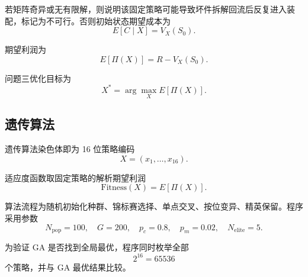若矩阵奇异或无有限解，则说明该固定策略可能导致坏件拆解回流后反复进入装配，标记为不可行。否则初始状态期望成本为
\[
E[C\mid X]=V_X(S_0).
\]

期望利润为
\[
E[\Pi(X)]
=
R-V_X(S_0).
\]

问题三优化目标为
\[
X^\ast=\arg\max_X E[\Pi(X)].
\]

\subsection{遗传算法}

遗传算法染色体即为 16 位策略编码
\[
X=(x_1,\ldots,x_{16}).
\]

适应度函数取固定策略的解析期望利润
\[
\mathrm{Fitness}(X)=E[\Pi(X)].
\]

算法流程为随机初始化种群、锦标赛选择、单点交叉、按位变异、精英保留。程序采用参数
\[
N_{\mathrm{pop}}=100,\quad
G=200,\quad
p_c=0.8,\quad
p_m=0.02,\quad
N_{\mathrm{elite}}=5.
\]

为验证 GA 是否找到全局最优，程序同时枚举全部
\[
2^{16}=65536
\]
个策略，并与 GA 最优结果比较。
